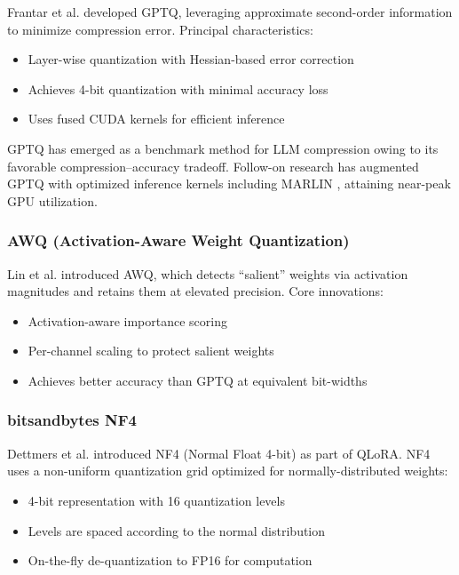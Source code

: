 \documentclass[11pt]{article}
\begin{document}
Frantar et al. \cite{frantar2022gptq} developed GPTQ, leveraging approximate second-order information to minimize compression error. Principal characteristics:
\begin{itemize}
    \item Layer-wise quantization with Hessian-based error correction
    \item Achieves 4-bit quantization with minimal accuracy loss
    \item Uses fused CUDA kernels for efficient inference
\end{itemize}

GPTQ has emerged as a benchmark method for LLM compression owing to its favorable compression--accuracy tradeoff. Follow-on research has augmented GPTQ with optimized inference kernels including MARLIN \cite{frantar2024marlin}, attaining near-peak GPU utilization.

\subsubsection{AWQ (Activation-Aware Weight Quantization)}

Lin et al. \cite{lin2023awq} introduced AWQ, which detects ``salient'' weights via activation magnitudes and retains them at elevated precision. Core innovations:
\begin{itemize}
    \item Activation-aware importance scoring
    \item Per-channel scaling to protect salient weights
    \item Achieves better accuracy than GPTQ at equivalent bit-widths
\end{itemize}

\subsubsection{bitsandbytes NF4}

Dettmers et al. \cite{dettmers2023qlora} introduced NF4 (Normal Float 4-bit) as part of QLoRA. NF4 uses a non-uniform quantization grid optimized for normally-distributed weights:
\begin{itemize}
    \item 4-bit representation with 16 quantization levels
    \item Levels are spaced according to the normal distribution
    \item On-the-fly de-quantization to FP16 for computation
\end{itemize}
\end{document}
